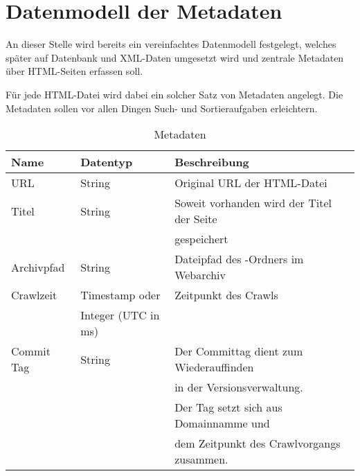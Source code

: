\chapter{Datenmodell der Metadaten} \label{spec:model}
An dieser Stelle wird bereits ein vereinfachtes Datenmodell festgelegt, welches
später auf Datenbank und XML-Daten umgesetzt wird und zentrale Metadaten über HTML-Seiten erfassen soll. 

Für jede HTML-Datei wird dabei ein solcher Satz von Metadaten angelegt.
Die Metadaten sollen vor allen Dingen Such- und Sortieraufgaben erleichtern. 

\begin{table}[h]
\centering
\begin{tabular}{|l|l|l|}	
	\hline
	Name 		& Datentyp 				& Beschreibung \\
	\hline
	URL 		& String 				& Original URL der HTML-Datei\\
	Titel 		& String 				& Soweit vorhanden wird der Titel der Seite \\ 
	 			& 						& gespeichert \\ 
	Archivpfad 	& String 				& Dateipfad des \htmlarc-Ordners im Webarchiv \\
	Crawlzeit 	& Timestamp oder 		& Zeitpunkt des Crawls \\
				& Integer (UTC in ms) 	&  \\
	Commit Tag 	& String 				& Der Committag dient zum Wiederauffinden \\
	 			& 						& in der Versionsverwaltung. \\ 
				& 						& Der Tag setzt sich aus Domainnamme und \\
				& 						& dem Zeitpunkt des Crawlvorgangs zusammen.\\
	\hline
\end{tabular}
\caption{Metadaten}
\end{table}

